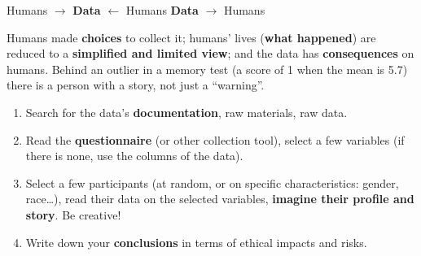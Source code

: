 \documentclass[11pt,a4paper,openany]{book}
\begin{document}
\begin{propbox}[title={Why humanize data?}]
\begin{center}
Humans $\to$ \textbf{Data} $\leftarrow$ Humans \qquad \textbf{Data} $\to$ Humans
\end{center}
Humans made \textbf{choices} to collect it; humans' lives (\textbf{what happened}) are reduced to
a \textbf{simplified and limited view}; and the data has \textbf{consequences} on humans. Behind
an outlier in a memory test (a score of 1 when the mean is 5.7) there is a person with a story,
not just a ``warning''.
\end{propbox}

\begin{algbox}[title={Procedure (cheat sheet)}]
\begin{enumerate}
  \item Search for the data's \textbf{documentation}, raw materials, raw data.
  \item Read the \textbf{questionnaire} (or other collection tool), select a few variables (if
        there is none, use the columns of the data).
  \item Select a few participants (at random, or on specific characteristics: gender, race\ldots),
        read their data on the selected variables, \textbf{imagine their profile and story}. Be
        creative!
  \item Write down your \textbf{conclusions} in terms of ethical impacts and risks.
\end{enumerate}
\end{algbox}
\end{document}

